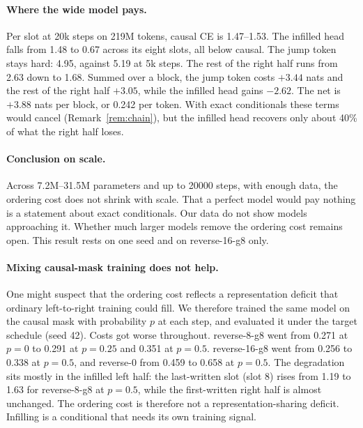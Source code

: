 \documentclass[11pt]{article}
\theoremstyle{definition}
\theoremstyle{remark}
\newcommand{\sch}[1]{\textsf{#1}}
\begin{document}
\paragraph{Where the wide model pays.}
Per slot at 20k steps on 219M tokens, causal CE is 1.47--1.53.
The infilled head falls from 1.48 to 0.67 across its eight slots, all below causal.
The jump token stays hard: 4.95, against 5.19 at 5k steps.
The rest of the right half runs from 2.63 down to 1.68.
Summed over a block, the jump token costs $+3.44$ nats and the rest of the right half $+3.05$, while the infilled head gains $-2.62$.
The net is $+3.88$ nats per block, or 0.242 per token.
With exact conditionals these terms would cancel (Remark~\ref{rem:chain}), but the infilled head recovers only about 40\% of what the right half loses.

\paragraph{Conclusion on scale.}
Across 7.2M--31.5M parameters and up to 20000 steps, with enough data, the ordering cost does not shrink with scale.
That a perfect model would pay nothing is a statement about exact conditionals.
Our data do not show models approaching it.
Whether much larger models remove the ordering cost remains open.
This result rests on one seed and on \sch{reverse-16-g8} only.

\paragraph{Mixing causal-mask training does not help.}
One might suspect that the ordering cost reflects a representation deficit that ordinary left-to-right training could fill.
We therefore trained the same model on the causal mask with probability $p$ at each step, and evaluated it under the target schedule (seed 42).
Costs got worse throughout.
\sch{reverse-8-g8} went from 0.271 at $p=0$ to 0.291 at $p=0.25$ and 0.351 at $p=0.5$.
\sch{reverse-16-g8} went from 0.256 to 0.338 at $p=0.5$, and \sch{reverse-0} from 0.459 to 0.658 at $p=0.5$.
The degradation sits mostly in the infilled left half: the last-written slot (slot 8) rises from 1.19 to 1.63 for \sch{reverse-8-g8} at $p=0.5$, while the first-written right half is almost unchanged.
The ordering cost is therefore not a representation-sharing deficit.
Infilling is a conditional that needs its own training signal.

\end{document}
